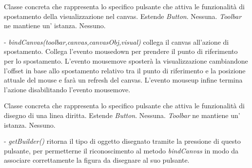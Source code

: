 Classe concreta che rappresenta lo specifico pulsante che attiva le funzionalit\` a di spostamento della visualizzazione nel canvas.
Estende \textit{Button}.
Nessuna.
\textit{Toolbar} ne mantiene un' istanza.
Nessuno.
\begin{elencopuntato}[\subsubsecindent]
\item[-] \textit{bindCanvas(toolbar,canvas,canvasObj,visual)} collega il canvas all'azione di spostamento. Collega l'evento mousedown per prendere il punto di riferimento per lo spostamento. L'evento mousemove sposter\`a la visualizzazione cambiandone l'offset in base allo spostamento relativo tra il punto di riferimento e la posizione attuale del mouse e far\`a un refresh del canvas. L'evento mouseup infine termina l'azione disabilitando l'evento mousemove.
\end{elencopuntato}

Classe concreta che rappresenta lo specifico pulsante che attiva le funzionalit\` a di disegno di una linea diritta.
Estende \textit{Button}.
Nessuna.
\textit{Toolbar} ne mantiene un' istanza.
Nessuno.
\begin{elencopuntato}[\subsubsecindent]
\item[-] \textit{getBuilder()} ritorna il tipo di oggetto disegnato tramite la pressione di questo pulsante, per permetterne il riconoscimento al metodo \textit{bindCanvas} in modo da associare correttamente la figura da disegnare al suo pulsante.
\end{elencopuntato}

